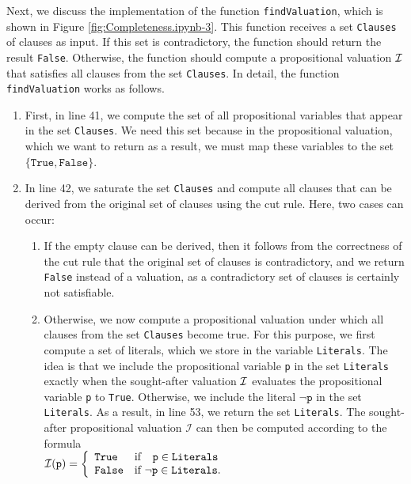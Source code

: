 Next, we discuss the implementation of the function \texttt{findValuation}, which is shown in
Figure \ref{fig:Completeness.ipynb-3}. This function receives a set \texttt{Clauses} of clauses as input.
If this set is contradictory, the function should return the result \texttt{False}.
Otherwise, the function should compute a propositional valuation $\mathcal{I}$ that satisfies all clauses from the set
\texttt{Clauses}. 
In detail, the function \texttt{findValuation} works as follows.
\begin{enumerate}
\item First, in line 41, we compute the set of all propositional variables that appear in the set
      \texttt{Clauses}. We need this set because in the
      propositional valuation, which we want to return as a result, we must
      map these variables to the set $\{ \texttt{True}, \texttt{False} \}$.
\item In line 42, we saturate the set \texttt{Clauses} and compute all clauses that can be derived from the
      original set of clauses using the cut rule. Here, two cases can occur:
      \begin{enumerate}
      \item If the empty clause can be derived, then it follows from the correctness of the cut rule
            that the original set of clauses is contradictory, and we return \texttt{False} instead of a valuation,
            as a contradictory set of clauses is certainly not satisfiable.
      \item Otherwise, we now compute a propositional valuation under which all clauses from
            the set \texttt{Clauses} become true. For this purpose, we first compute a set of
            literals, which we store in the variable \texttt{Literals}. The idea is that we
            include the propositional variable \texttt{p} in the set \texttt{Literals} exactly when
            the sought-after valuation $\mathcal{I}$ evaluates the propositional
            variable \texttt{p} to \texttt{True}. Otherwise, we include the
            literal $\neg \texttt{p}$ in the set \texttt{Literals}. As a result, in
            line 53, we return the set \texttt{Literals}. The sought-after propositional valuation
            $\mathcal{I}$ can then be computed according to the formula  
            \\[0.2cm]
            \hspace*{1.3cm}
            $\mathcal{I}(\texttt{p}) = \left\{
             \begin{array}{ll}
               \texttt{True}  & \mbox{if $\hspace*{0.25cm}\texttt{p} \in \texttt{Literals}$} \\
               \texttt{False} & \mbox{if $\neg\texttt{p} \in \texttt{Literals}$.}
             \end{array}\right.
            $
           

\end{enumerate}
\end{enumerate}
